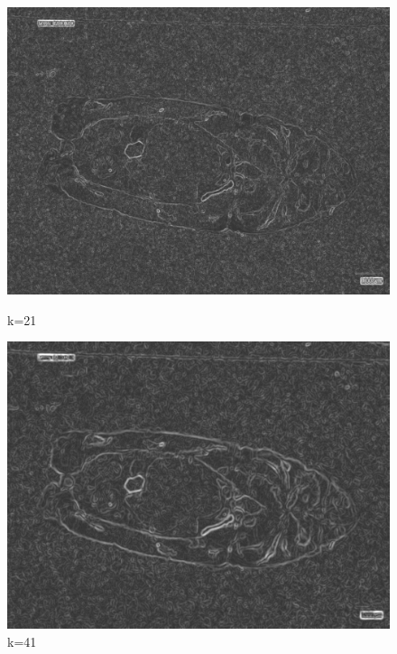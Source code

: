 \begin{figure}
    \centering
    \begin{minipage}{0.24\textwidth}
        \centering
        \includegraphics[width=\textwidth]{./fig/gausssian/sobel21.jpg}
        \caption*{k=21}
        \label{fig:sobel21}
    \end{minipage}
    \begin{minipage}{0.24\textwidth}
        \centering
        \includegraphics[width=\textwidth]{./fig/gausssian/sobel41.jpg}
        \caption*{k=41}
        \label{fig:sobel41}
    \end{minipage}
    \begin{minipage}{0.24\textwidth}
        \centering

\end{minipage}
\end{figure}
